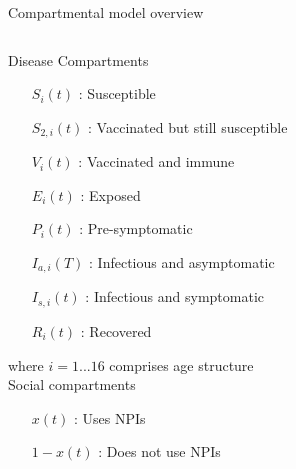 \documentclass{beamer}
\begin{document}
\begin{frame}{Compartmental model overview}
    \begin{columns}
        \begin{column}{0.6\textwidth}
        \footnotesize
        Disease Compartments
            \begin{itemize}
                \item[$S_i(t)$] : Susceptible
                \item[$S_{2,i}(t)$] : Vaccinated but still susceptible
                \item[$V_i(t)$] : Vaccinated and immune 
                \item[$E_i(t)$] : Exposed 
                \item[$P_i(t)$] : Pre-symptomatic
                \item[$I_{a,i}(T)$] : Infectious and asymptomatic
                \item[$I_{s,i}(t)$] : Infectious and symptomatic
                \item[$R_i(t)$] : Recovered 
            \end{itemize}
        \tiny{where $i = 1 ... 16$} comprises age structure\\
        \footnotesize
        \vspace{0.1cm}
        Social compartments
        \begin{itemize}
            \item[$x(t)$] : Uses NPIs
            \item[$1 - x(t)$] : Does not use NPIs
        \end{itemize}

        \end{column}

        \begin{column}{0.4\textwidth}
            \small


            \begin{figure}
                \begin{tikzpicture}[node distance=1cm, auto,
                    >=Latex, 
                    every node/.append style={align=center},
                    int/.style={draw, minimum size=0.5cm}]
                

\end{tikzpicture}
\end{figure}
\end{column}
\end{columns}
\end{frame}
\end{document}
